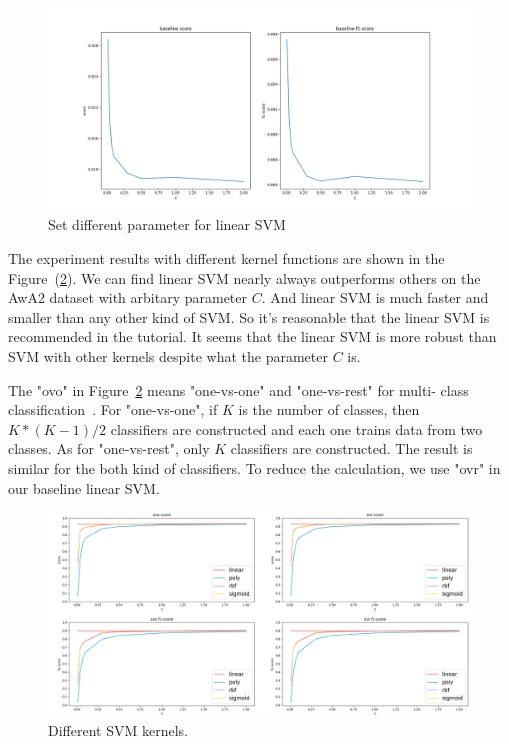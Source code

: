 \documentclass{article}
\begin{document}
\begin{figure}
	\label{fig:lSVM}
	\caption{Set different parameter for linear SVM}
	\includegraphics[width=\linewidth]{figs/baseline.png}
\end{figure}

The experiment results with different kernel functions are shown in the Figure~(\ref{fig:SVM}). We can find linear SVM nearly always outperforms others on the AwA2 dataset with arbitary parameter $C$. And linear SVM is much faster and smaller than any other kind of SVM. So it's reasonable that the linear SVM is recommended in the tutorial. It seems that the linear SVM is more robust than SVM with other kernels despite what the parameter $C$ is.

The "ovo" in Figure~\ref{fig:SVM} means "one-vs-one" and "one-vs-rest" for multi- class classification~\cite{}. For "one-vs-one", if $K$ is the number of classes, then $K * (K - 1) / 2$ classifiers are constructed and each one trains data from two classes. As for "one-vs-rest", only $K$ classifiers are constructed. The result is similar for the both kind of classifiers. To reduce the calculation, we use "ovr" in our baseline linear SVM.

\begin{figure}
	\label{fig:SVM}
	\caption{Different SVM kernels.}
	\includegraphics[width=\linewidth]{figs/compare.png}
\end{figure}
\end{document}
